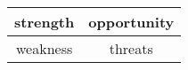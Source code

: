 \begin{tabular}{ | c | c | }
    \hline
    {{ strength }} & {{ opportunity }}  \\ \hline
    {{ weakness }} & {{ threats }}  \\ \hline
    \hline
  \end{tabular}